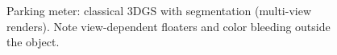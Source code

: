 \begin{figure}[H]
    \centering
    \caption{Parking meter: classical 3DGS with segmentation (multi-view renders). Note view-dependent floaters and color bleeding outside the object.}
    \label{fig:baseline_classic_segmented}
\end{figure}

